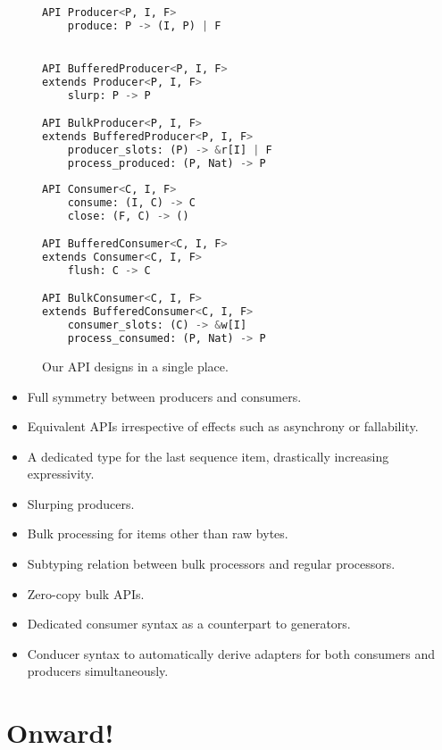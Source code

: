 \documentclass[sigplan,screen,10pt,review]{acmart}
\begin{document}
\begin{figure*}
    \centering
    \begin{minipage}[t]{.5\textwidth}
\begin{lstlisting}[language=Python]
API Producer<P, I, F>
    produce: P -> (I, P) | F


API BufferedProducer<P, I, F>
extends Producer<P, I, F>
    slurp: P -> P

API BulkProducer<P, I, F>
extends BufferedProducer<P, I, F>
    producer_slots: (P) -> &r[I] | F
    process_produced: (P, Nat) -> P
\end{lstlisting}
\end{minipage}%
\begin{minipage}[t]{.5\textwidth}
\begin{lstlisting}[language=Python]
API Consumer<C, I, F>
    consume: (I, C) -> C
    close: (F, C) -> ()

API BufferedConsumer<C, I, F>
extends Consumer<C, I, F>
    flush: C -> C

API BulkConsumer<C, I, F>
extends BufferedConsumer<C, I, F>
    consumer_slots: (C) -> &w[I]
    process_consumed: (P, Nat) -> P
\end{lstlisting}
    \end{minipage}
    \caption{Our API designs in a single place.}
    \label{apiSummary}
\end{figure*}

\begin{itemize}
    \item Full symmetry between producers and consumers.
    \item Equivalent APIs irrespective of effects such as asynchrony or fallability.
    \item A dedicated type for the last sequence item, drastically increasing expressivity.
    \item Slurping producers.
    \item Bulk processing for items other than raw bytes.
    \item Subtyping relation between bulk processors and regular processors.
    \item Zero-copy bulk APIs.
    \item Dedicated consumer syntax as a counterpart to generators.
    \item Conducer syntax to automatically derive adapters for both consumers and producers simultaneously.
\end{itemize}

\section{Onward!}\label{fun}
\end{document}
